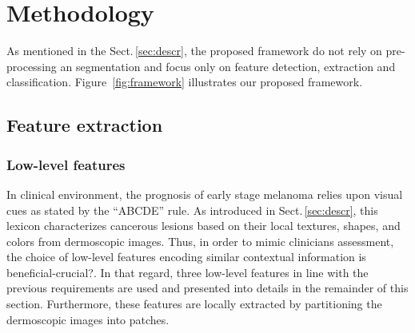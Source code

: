 \section{Methodology}
\label{sec:method}
\graphicspath{ {./content/method/figures/} }
As mentioned in the Sect.\,\ref{sec:descr}, the proposed framework do not rely on pre-processing an segmentation and focus only on feature detection, extraction and classification.
Figure~\ref{fig:framework} illustrates our proposed framework.


\subsection{Feature extraction}

\subsubsection{Low-level features}

In clinical environment, the prognosis of early stage melanoma relies upon visual cues as stated by the ``ABCDE'' rule.
As introduced in Sect.\,\ref{sec:descr}, this lexicon characterizes cancerous lesions based on their local textures, shapes, and colors from dermoscopic images.
Thus, in order to mimic clinicians assessment, the choice of low-level features encoding similar contextual information is beneficial{\color{red}-crucial?}.
In that regard, three low-level features in line with the previous requirements are used and presented into details in the remainder of this section.
Furthermore, these features are locally extracted by partitioning the dermoscopic images into patches.



